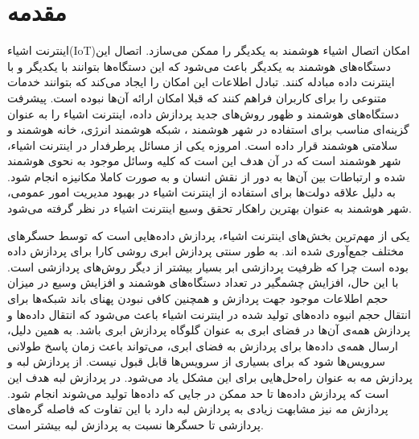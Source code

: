 
\chapter{مقدمه}
  \thispagestyle{empty}
    اینترنت اشیاء(IoT)امکان اتصال اشیاء هوشمند به یکدیگر را ممکن می‌سازد.
    اتصال این دستگاه‌های هوشمند به یکدیگر باعث می‌شود که این دستگاه‌ها بتوانند با یکدیگر و با اینترنت داده مبادله کنند.
    تبادل اطلاعات این امکان را ایجاد می‌کند که بتوانند خدمات متنوعی را برای کاربران فراهم کنند که قبلا امکان ارائه آن‌ها نبوده است.
    پیشرفت دستگاه‌های هوشمند و ظهور روش‌های جدید پردازش داده، اینترنت اشیاء را به عنوان گزینه‌ای مناسب برای استفاده در شهر هوشمند ، شبکه هوشمند انرژی، خانه هوشمند و سلامتی هوشمند قرار داده است.
    امروزه یکی از مسائل پرطرفدار در اینترنت اشیاء، شهر هوشمند است که در آن هدف این است که کلیه وسائل موجود به نحوی هوشمند شده و ارتباطات بین آن‌ها به دور از نقش انسان و به صورت کاملا مکانیزه انجام شود.
    به دلیل علاقه دولت‌‌ها برای استفاده از اینترنت اشیاء در بهبود مدیریت امور عمومی، شهر هوشمند به عنوان بهترین راهکار تحقق وسیع اینترنت اشیاء در نظر گرفته می‌شود.

    یکی از مهم‌ترین بخش‌های اینترنت اشیاء، پردازش داده‌هایی است که توسط حسگر‌های مختلف جمع‌آوری شده‌ اند.
    به طور سنتی پردازش ابری روشی کارا برای پردازش داده بوده است چرا که ظرفیت پردازشی ابر بسیار بیشتر از دیگر روش‌های پردازشی است.
    با این حال، افزایش چشمگیر در تعداد دستگاه‌های هوشمند و افزایش وسیع در میزان حجم اطلاعات موجود جهت پردازش و همچنین کافی نبودن پهنای باند شبکه‌ها برای انتقال حجم انبوه داده‌های تولید شده در اینترنت اشیاء باعث می‌شود که انتقال داده‌ها و پردازش همه‌ی آن‌ها در فضای ابری به عنوان گلوگاه پردازش ابری باشد.
    به همین دلیل، ارسال همه‌ی داده‌ها برای پردازش به فضای ابری، می‌تواند باعث زمان پاسخ طولانی سرویس‌ها شود که برای بسیاری از سرویس‌ها قابل قبول نیست.
    از پردازش لبه و پردازش مه به عنوان راه‌حل‌هایی برای این مشکل یاد می‌شود.
    در پردازش لبه هدف این است که پردازش داده‌ها تا حد ممکن در جایی که داده‌ها تولید می‌شوند انجام شود.
    پردازش مه نیز مشابهت زیادی به پردازش لبه دارد با این تفاوت که فاصله گره‌های پردازشی تا حسگرها نسبت به پردازش لبه بیشتر است. 

